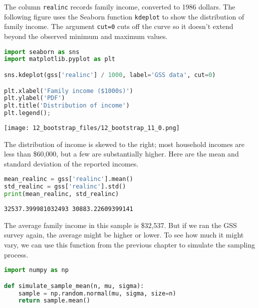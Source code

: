 The column \passthrough{\lstinline!realinc!} records family income,
converted to 1986 dollars. The following figure uses the Seaborn
function \passthrough{\lstinline!kdeplot!} to show the distribution of
family income. The argument \passthrough{\lstinline!cut=0!} cuts off the
curve so it doesn't extend beyond the observed minimum and maximum
values.

\begin{lstlisting}[language=Python,style=source]
import seaborn as sns
import matplotlib.pyplot as plt

sns.kdeplot(gss['realinc'] / 1000, label='GSS data', cut=0)

plt.xlabel('Family income ($1000s)')
plt.ylabel('PDF')
plt.title('Distribution of income')
plt.legend();
\end{lstlisting}

\begin{center}
\texttt{[image: 12\_bootstrap\_files/12\_bootstrap\_11\_0.png]}
\end{center}

The distribution of income is skewed to the right; most household
incomes are less than \$60,000, but a few are substantially higher. Here
are the mean and standard deviation of the reported incomes.

\begin{lstlisting}[language=Python,style=source]
mean_realinc = gss['realinc'].mean()
std_realinc = gss['realinc'].std()
print(mean_realinc, std_realinc)
\end{lstlisting}

\begin{lstlisting}[style=output]
32537.399981032493 30883.22609399141
\end{lstlisting}

The average family income in this sample is \$32,537. But if we ran the
GSS survey again, the average might be higher or lower. To see how much
it might vary, we can use this function from the previous chapter to
simulate the sampling process.

\begin{lstlisting}[language=Python,style=source]
import numpy as np

def simulate_sample_mean(n, mu, sigma):
    sample = np.random.normal(mu, sigma, size=n)
    return sample.mean()
\end{lstlisting}

